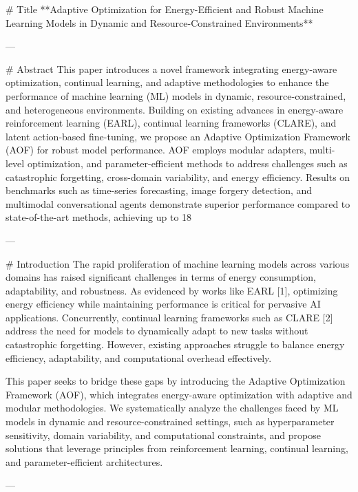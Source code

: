 # Title  
**Adaptive Optimization for Energy-Efficient and Robust Machine Learning Models in Dynamic and Resource-Constrained Environments**

---

# Abstract  
This paper introduces a novel framework integrating energy-aware optimization, continual learning, and adaptive methodologies to enhance the performance of machine learning (ML) models in dynamic, resource-constrained, and heterogeneous environments. Building on existing advances in energy-aware reinforcement learning (EARL), continual learning frameworks (CLARE), and latent action-based fine-tuning, we propose an Adaptive Optimization Framework (AOF) for robust model performance. AOF employs modular adapters, multi-level optimization, and parameter-efficient methods to address challenges such as catastrophic forgetting, cross-domain variability, and energy efficiency. Results on benchmarks such as time-series forecasting, image forgery detection, and multimodal conversational agents demonstrate superior performance compared to state-of-the-art methods, achieving up to 18%

---

# Introduction  
The rapid proliferation of machine learning models across various domains has raised significant challenges in terms of energy consumption, adaptability, and robustness. As evidenced by works like EARL [1], optimizing energy efficiency while maintaining performance is critical for pervasive AI applications. Concurrently, continual learning frameworks such as CLARE [2] address the need for models to dynamically adapt to new tasks without catastrophic forgetting. However, existing approaches struggle to balance energy efficiency, adaptability, and computational overhead effectively.  

This paper seeks to bridge these gaps by introducing the Adaptive Optimization Framework (AOF), which integrates energy-aware optimization with adaptive and modular methodologies. We systematically analyze the challenges faced by ML models in dynamic and resource-constrained settings, such as hyperparameter sensitivity, domain variability, and computational constraints, and propose solutions that leverage principles from reinforcement learning, continual learning, and parameter-efficient architectures.

---

